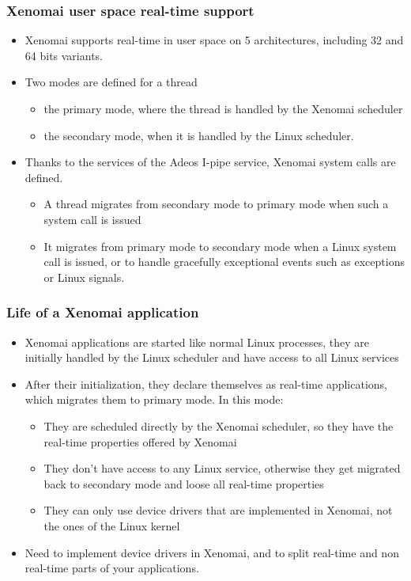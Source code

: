 \begin{frame}
  \frametitle{Xenomai user space real-time support}
  \begin{itemize}
  \item Xenomai supports real-time in user space on 5 architectures,
    including 32 and 64 bits variants.
  \item Two modes are defined for a thread
    \begin{itemize}
    \item the primary mode, where the thread is handled by the Xenomai
      scheduler
    \item the secondary mode, when it is handled by the Linux scheduler.
    \end{itemize}
  \item Thanks to the services of the Adeos I-pipe service, Xenomai
    system calls are defined.
    \begin{itemize}
    \item A thread migrates from secondary mode to primary mode when
      such a system call is issued
    \item It migrates from primary mode to secondary mode when a Linux
      system call is issued, or to handle gracefully exceptional
      events such as exceptions or Linux signals.
    \end{itemize}
  \end{itemize}
\end{frame}

\begin{frame}
  \frametitle{Life of a Xenomai application}
  \begin{itemize}
  \item Xenomai applications are started like normal Linux processes,
    they are initially handled by the Linux scheduler and have access
    to all Linux services
  \item After their initialization, they declare themselves as
    real-time applications, which migrates them to primary mode. In
    this mode:
    \begin{itemize}
    \item They are scheduled directly by the Xenomai scheduler, so
      they have the real-time properties offered by Xenomai
    \item They don't have access to any Linux service, otherwise they
      get migrated back to secondary mode and loose all real-time
      properties
    \item They can only use device drivers that are implemented in
      Xenomai, not the ones of the Linux kernel
    \end{itemize}
  \item Need to implement device drivers in Xenomai, and to split
    real-time and non real-time parts of your applications.
  \end{itemize}
\end{frame}

